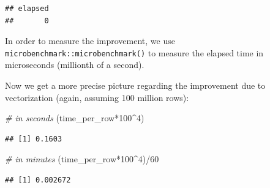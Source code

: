 \documentclass[
  12pt,
]{style/krantz}
\newenvironment{Shaded}{\begin{snugshade}}{\end{snugshade}}
\newcommand{\CommentTok}[1]{\textcolor[rgb]{0.56,0.35,0.01}{\textit{#1}}}
\newcommand{\DecValTok}[1]{\textcolor[rgb]{0.00,0.00,0.81}{#1}}
\newcommand{\FunctionTok}[1]{\textcolor[rgb]{0.00,0.00,0.00}{#1}}
\newcommand{\NormalTok}[1]{#1}
\newcommand{\OtherTok}[1]{\textcolor[rgb]{0.56,0.35,0.01}{#1}}
\newcommand{\SpecialCharTok}[1]{\textcolor[rgb]{0.00,0.00,0.00}{#1}}
\begin{document}
\begin{verbatim}
## elapsed 
##       0
\end{verbatim}

In order to measure the improvement, we use \texttt{microbenchmark::microbenchmark()} to measure the elapsed time in microseconds (millionth of a second).

\begin{Shaded}
\end{Shaded}

Now we get a more precise picture regarding the improvement due to vectorization (again, assuming 100 million rows):

\begin{Shaded}
\begin{Highlighting}[]
\CommentTok{\# in seconds}
\NormalTok{(time\_per\_row}\SpecialCharTok{*}\DecValTok{100}\SpecialCharTok{\^{}}\DecValTok{4}\NormalTok{) }
\end{Highlighting}
\end{Shaded}

\begin{verbatim}
## [1] 0.1603
\end{verbatim}

\begin{Shaded}
\begin{Highlighting}[]
\CommentTok{\# in minutes}
\NormalTok{(time\_per\_row}\SpecialCharTok{*}\DecValTok{100}\SpecialCharTok{\^{}}\DecValTok{4}\NormalTok{)}\SpecialCharTok{/}\DecValTok{60} 
\end{Highlighting}
\end{Shaded}

\begin{verbatim}
## [1] 0.002672
\end{verbatim}
\end{document}
